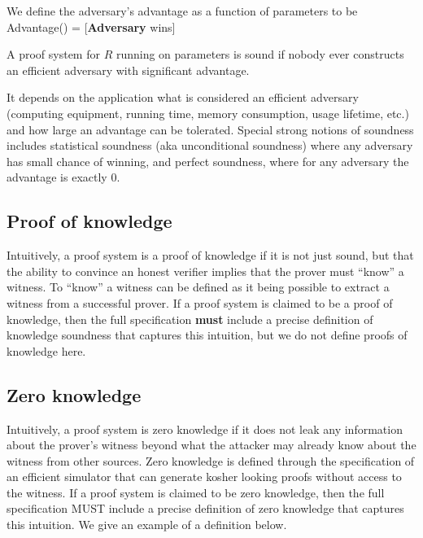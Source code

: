 We define the adversary’s advantage as a function of parameters to be \newline
\hphantom{We define the } Advantage(\params) = [\textbf{Adversary} wins]
 
A proof system for $R$ running on parameters is sound if nobody ever constructs an efficient adversary with significant advantage.
 
It depends on the application what is considered an efficient adversary (computing equipment, running time, memory consumption, usage lifetime, etc.) and how large an advantage can be tolerated. 
Special strong notions of soundness includes statistical soundness (aka unconditional soundness) where any adversary has small chance of winning, and perfect soundness, where for any adversary the advantage is exactly 0.


\subsection{Proof of knowledge}
\label{sec:security:defs-props:proof-of-knowledge}

 Intuitively, a proof system is a proof of knowledge if it is not just sound, but that the ability to convince an honest verifier implies that the prover must “know” a witness. 
To “know” a witness can be defined as it being possible to extract a witness from a successful prover. 
If a proof system is claimed to be a proof of knowledge, then the full specification \textbf{must} include a precise definition of knowledge soundness that captures this intuition, but we do not define proofs of knowledge here.


\subsection{Zero knowledge}
\label{sec:security:defs-props:zero-knowledge}

Intuitively, a proof system is zero knowledge if it does not leak any information about the prover’s witness beyond what the attacker may already know about the witness from other sources. Zero knowledge is defined through the specification of an efficient simulator that can generate kosher looking proofs without access to the witness. 
If a proof system is claimed to be zero knowledge, then the full specification MUST include a precise definition of zero knowledge that captures this intuition. 
We give an example of a definition below.
 
